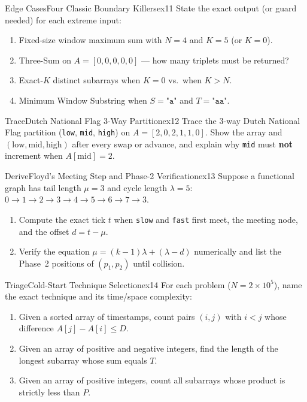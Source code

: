 \documentclass[11pt,a4paper]{article}
\theoremstyle{definition}
\begin{document}
\begin{tryitbox}{Edge Cases}{Four Classic Boundary Killers}{ex11}
State the exact output (or guard needed) for each extreme input:
\begin{enumerate}[itemsep=1pt, topsep=2pt]
    \item Fixed-size window maximum sum with $N = 4$ and $K = 5$ (or $K = 0$).
    \item Three-Sum on $A = [0, 0, 0, 0, 0]$ --- how many triplets must be returned?
    \item Exact-$K$ distinct subarrays when $K = 0$ vs.\ when $K > N$.
    \item Minimum Window Substring when $S = \texttt{"a"}$ and $T = \texttt{"aa"}$.
\end{enumerate}
\end{tryitbox}

\begin{tryitbox}{Trace}{Dutch National Flag 3-Way Partition}{ex12}
Trace the 3-way Dutch National Flag partition (\texttt{low}, \texttt{mid}, \texttt{high}) on $A = [2, 0, 2, 1, 1, 0]$. Show the array and $(\text{low}, \text{mid}, \text{high})$ after every swap or advance, and explain why \texttt{mid} must \textbf{not} increment when $A[\text{mid}] = 2$.
\end{tryitbox}

\begin{tryitbox}{Derive}{Floyd's Meeting Step and Phase-2 Verification}{ex13}
Suppose a functional graph has tail length $\mu = 3$ and cycle length $\lambda = 5$: $0 \to 1 \to 2 \to 3 \to 4 \to 5 \to 6 \to 7 \to 3$.
\begin{enumerate}[itemsep=2pt, topsep=2pt]
    \item Compute the exact tick $t$ when \texttt{slow} and \texttt{fast} first meet, the meeting node, and the offset $d = t - \mu$.
    \item Verify the equation $\mu = (k - 1)\lambda + (\lambda - d)$ numerically and list the Phase~2 positions of $(p_1, p_2)$ until collision.
\end{enumerate}
\end{tryitbox}

\begin{tryitbox}{Triage}{Cold-Start Technique Selection}{ex14}
For each problem ($N = 2 \times 10^5$), name the exact technique and its time/space complexity:
\begin{enumerate}[itemsep=1pt, topsep=2pt]
    \item Given a sorted array of timestamps, count pairs $(i, j)$ with $i < j$ whose difference $A[j] - A[i] \le D$.
    \item Given an array of positive and negative integers, find the length of the longest subarray whose sum equals $T$.
    \item Given an array of positive integers, count all subarrays whose product is strictly less than $P$.
\end{enumerate}
\end{tryitbox}
\end{document}
